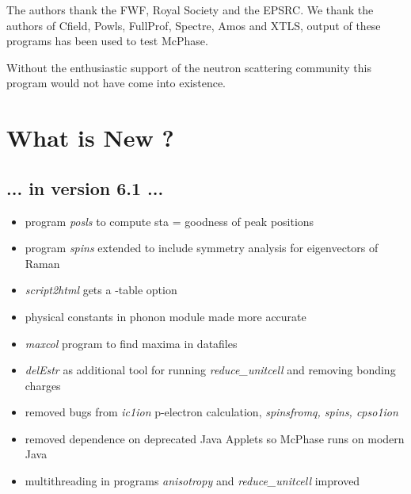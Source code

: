 \documentclass[twoside]{article}
\newcommand{\prg}{\sl}
\begin{document}
The authors thank the FWF, Royal Society and the EPSRC.
We thank the authors of Cfield, Powls, FullProf, Spectre, Amos and XTLS, output 
of these programs has been used to test McPhase. 

Without the enthusiastic support of the neutron scattering 
community this program would not have come into existence. 

\section*{What is New ?}
\subsection*{ ... in version 6.1 ...}
\begin{itemize}
\item program {\prg  posls} to compute sta = goodness of peak positions 
\item program {\prg spins} extended to include symmetry analysis for eigenvectors of Raman
\item {\prg script2html} gets a -table option
\item physical constants in phonon module made more accurate
\item {\prg maxcol} program to find maxima in datafiles
\item {\prg delEstr} as additional tool for running {\prg reduce\_unitcell} and removing bonding charges
\item removed bugs from {\prg  ic1ion} p-electron calculation, {\prg  spinsfromq, spins, cpso1ion}
\item removed dependence on deprecated Java Applets so McPhase runs on modern Java
\item multithreading in programs {\prg  anisotropy} and {\prg reduce\_unitcell} improved
\end{itemize}
\end{document}
